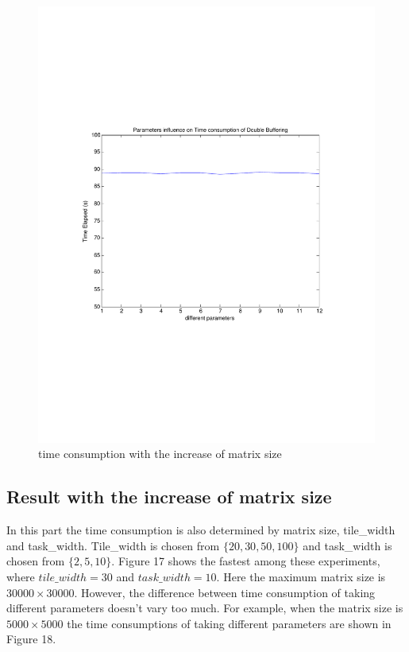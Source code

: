 \documentclass {article}
\begin{document}
\begin{figure}[hbp!]
\centering
\includegraphics[width = \linewidth]{r_gpu42.pdf}
\caption{time consumption with the increase of matrix size}
\label{fig:rgpu41}
\end{figure}

\subsection{Result with the increase of matrix size}

In this part the time consumption is also determined by matrix size, tile\_width and task\_width. Tile\_width is chosen from $\{ 20, 30, 50, 100\}$ and task\_width is chosen from $\{2, 5, 10\}$. Figure 17 shows the fastest among these experiments, where $tile\_width = 30$ and $task\_width = 10$. Here the maximum matrix size is $30000 \times 30000$. However, the difference between time consumption of taking different parameters doesn't vary too much. For example, when the matrix size is $5000 \times 5000$ the time consumptions of taking different parameters are shown in Figure 18.  
\end{document}
